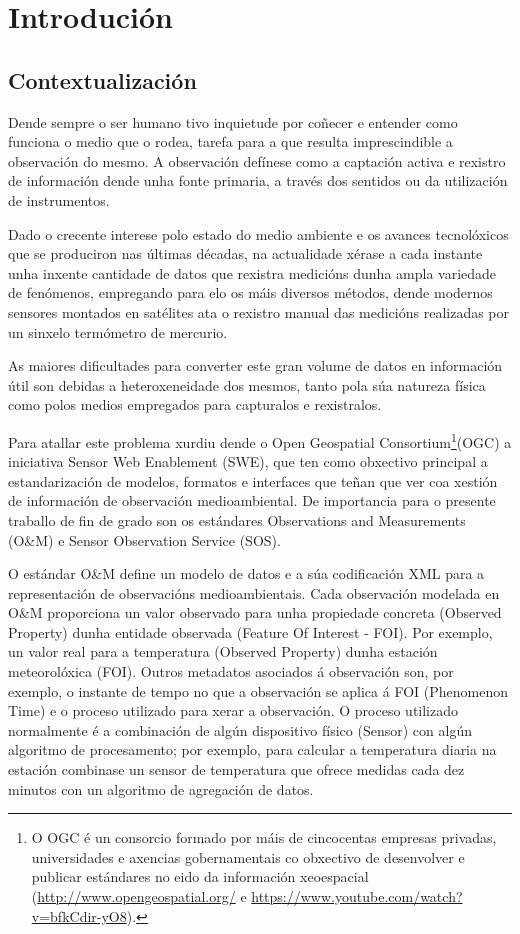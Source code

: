\chapter{Introdución}
\section{Contextualización}
Dende sempre o ser humano tivo inquietude por coñecer e entender como funciona o medio que o rodea, tarefa para a que resulta imprescindible a observación do mesmo. A observación defínese como a captación activa e rexistro de información dende unha fonte primaria, a través dos sentidos ou da utilización de instrumentos.

Dado o crecente interese polo estado do medio ambiente e os avances tecnolóxicos que se produciron nas últimas décadas, na actualidade xérase a cada instante unha inxente cantidade de datos que rexistra medicións dunha ampla variedade de fenómenos, empregando para elo os máis diversos métodos, dende modernos sensores montados en satélites ata o rexistro manual das medicións realizadas por un sinxelo termómetro de mercurio.

As maiores dificultades para converter este gran volume de datos en información útil son debidas a heteroxeneidade dos mesmos, tanto pola súa natureza física como polos medios empregados para capturalos e rexistralos.

Para atallar este problema xurdiu dende o Open Geospatial Consortium\footnote{O OGC é un consorcio formado por máis de cincocentas empresas privadas, universidades e axencias gobernamentais co obxectivo de desenvolver e publicar estándares no eido da información xeoespacial (\url{http://www.opengeospatial.org/} e \url{https://www.youtube.com/watch?v=bfkCdir-yO8}).}(OGC) a iniciativa Sensor Web Enablement (SWE), que ten como obxectivo principal a estandarización de modelos, formatos e interfaces que teñan que ver coa xestión de información de observación medioambiental. De importancia para o presente traballo de fin de grado son os estándares Observations and Measurements (O\&M) e Sensor Observation Service (SOS).

O estándar O\&M define un modelo de datos e a súa codificación XML para a representación de observacións medioambientais. Cada observación modelada en O\&M proporciona un valor observado para unha propiedade concreta (Observed Property) dunha entidade observada (Feature Of Interest - FOI). Por exemplo, un valor real para a temperatura (Observed Property) dunha estación meteorolóxica (FOI). Outros metadatos asociados á observación son, por exemplo, o instante de tempo no que a observación se aplica á FOI (Phenomenon Time) e o proceso utilizado para xerar a observación. O proceso utilizado normalmente é a combinación de algún dispositivo físico (Sensor) con algún algoritmo de procesamento; por exemplo, para calcular a temperatura diaria na estación combinase un sensor de temperatura que ofrece medidas cada dez minutos con un algoritmo de agregación de datos.

